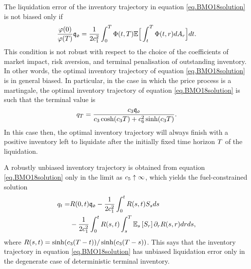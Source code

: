 \documentclass[10pt,a4paper]{article}
\begin{document}
	The liquidation error of the inventory trajectory in equation \eqref{eq.BMO18solution} is not biased only if 
	\begin{equation*}
	\frac{\varphi(0)}{\varphi(T)}\mathfrak{q_0} 
	= \frac{1}{2c_{1}^{2}} \int_{0}^{T} \Phi(t,T)\mathbb{{E}} \Big[\int_{t}^{T} \Phi(t,r)dA_r\Big]dt. 
	\end{equation*}
	This condition is not robust with respect to the choice of the coefficients of market impact, risk aversion, and terminal penalisation of outstanding inventory. In other words, the optimal inventory trajectory of equation \eqref{eq.BMO18solution} is in general biased. In particular, in the case in which the price process is a martingale, the optimal inventory trajectory of equation \eqref{eq.BMO18solution} is such that the terminal value is 
	\begin{equation*}
	q_T = \frac{c_{3} \mathfrak{q_0}}{c_{3} \cosh (c_{3} T ) + c_{6}^{2} \sinh(c_{3} T)}.
	\end{equation*}
	In this case then, the optimal inventory trajectory will always finish with a positive inventory left to liquidate after the initially fixed time horizon $T$ of the liquidation. 
	
	A robustly unbiased inventory trajectory is obtained from equation \eqref{eq.BMO18solution} only in the limit as $c_{5} \uparrow \infty$, which yields the fuel-constrained solution 
	\begin{equation*}
	\begin{split}
	q_t =& R(0,t)\mathfrak{q_0} - \frac{1}{2c_{1}^{2}} \int_{0}^{t} R(s,t)S_s ds \\ 
	& - \frac{1}{2c_{1}^{2}} \int_{0}^{t} R(s,t) \int_{s}^{T} \mathbb{{E}}_s \left[ S_r\right] \partial_r R(s,r) dr ds,
	\end{split}
	\end{equation*}
	where $R(s,t)= \sinh(c_{3} (T - t)) / \sinh(c_{3} (T - s))$. This says that the inventory trajectory in equation \eqref{eq.BMO18solution} has unbiased liquidation error only in the degenerate case of deterministic terminal inventory. 
	
\end{document}
